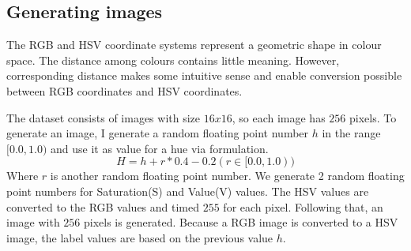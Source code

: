 \subsection{Generating images}

The RGB and HSV coordinate systems represent a geometric shape in colour space. The distance among colours contains little meaning. However, corresponding distance makes some intuitive sense and enable conversion possible between RGB coordinates and HSV coordinates.

The dataset consists of images with size $16x16$, so each image has $256$ pixels. To generate an image, I generate a random floating point number $h$ in the range $[0.0, 1.0)$ and use it as value for a hue via formulation.
\begin{equation}\label{eq:FormulationHue}
H = h + r * 0.4 - 0.2 (r \in [0.0,1.0))
\end{equation}
Where $r$ is another random floating point number. We generate 2 random floating point numbers for Saturation(S) and Value(V) values. The HSV values are converted to the RGB values and timed $255$ for each pixel. Following that, an image with $256$ pixels is generated. Because a RGB image is converted to a HSV image, the label values are based on the previous value $h$.

